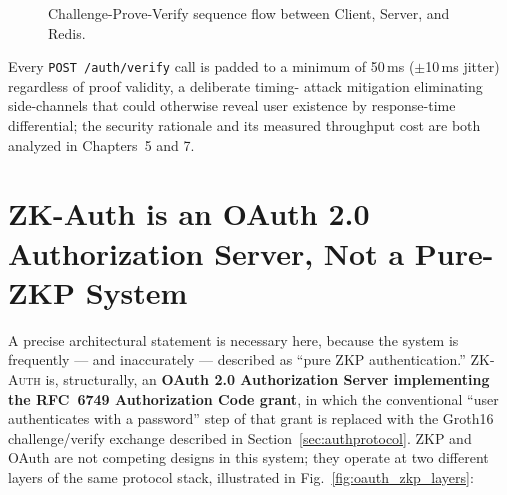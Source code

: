 \documentclass[12pt,a4paper,oneside]{report}
\begin{document}
\begin{figure}[htbp]
\centering
{}
\caption{Challenge-Prove-Verify sequence flow between Client, Server, and Redis.}
\label{fig:seq_diagram}
\end{figure}

Every \texttt{POST /auth/verify} call is padded to a minimum of 50\,ms
($\pm$10\,ms jitter) regardless of proof validity, a deliberate timing-
attack mitigation eliminating side-channels that could otherwise reveal
user existence by response-time differential; the security rationale and
its measured throughput cost are both analyzed in Chapters~5 and 7.

\section{ZK-Auth is an OAuth 2.0 Authorization Server, Not a Pure-ZKP System}
\label{sec:oauth_zkp}

A precise architectural statement is necessary here, because the
system is frequently --- and inaccurately --- described as ``pure ZKP
authentication.'' \textsc{ZK-Auth} is, structurally, an
\textbf{OAuth 2.0 Authorization Server implementing the RFC~6749
Authorization Code grant}, in which the conventional
``user authenticates with a password'' step of that grant is replaced
with the Groth16 challenge/verify exchange described in
Section~\ref{sec:authprotocol}. ZKP and OAuth are not competing
designs in this system; they operate at two different layers of the
same protocol stack, illustrated in Fig.~\ref{fig:oauth_zkp_layers}:
\end{document}
